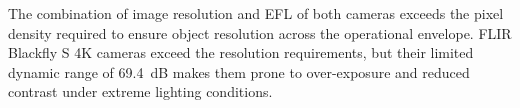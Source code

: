 \documentclass{erauthesis}
\begin{document}
The combination of image resolution and \ac{EFL} of both cameras  exceeds the pixel density required to ensure object resolution across the operational envelope.
FLIR Blackfly S 4K cameras exceed the resolution requirements, but their limited dynamic range of 69.4~dB makes them prone to over-exposure and reduced contrast under extreme lighting conditions. 

\begin{figure}[htbp]
\centering
{}
\end{figure}
\end{document}
